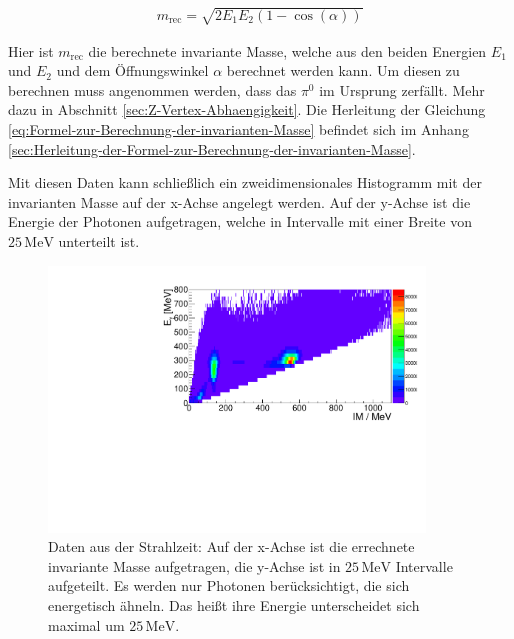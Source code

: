 \documentclass[a4paper,11pt,oneside,final,german,openbib,pdftex]{scrbook}
\begin{document}
{ \begin{equation}
 \begin{split}
 {m_{\text{rec}}=\sqrt{2E_1E_2(1-\cos(\alpha))}}
 \label{eq:Formel-zur-Berechnung-der-invarianten-Masse}
 \end{split}
 \end{equation}

Hier ist $m_{\text{rec}}$ die berechnete invariante Masse, welche aus den beiden Energien $E_1$ und $E_2$ und dem \"Offnungswinkel $\alpha$ berechnet werden kann. Um diesen zu berechnen muss angenommen werden, dass das $\pi^0$ im Ursprung zerf\"allt. Mehr dazu in Abschnitt \ref{sec:Z-Vertex-Abhaengigkeit}.
Die Herleitung der Gleichung \ref{eq:Formel-zur-Berechnung-der-invarianten-Masse} befindet sich im Anhang \ref{sec:Herleitung-der-Formel-zur-Berechnung-der-invarianten-Masse}.

Mit diesen Daten kann schließlich ein zweidimensionales Histogramm mit der invarianten Masse auf der x-Achse angelegt werden. Auf der y-Achse ist die Energie der Photonen aufgetragen, welche in Intervalle mit einer Breite von $25 \,\text{MeV}$ unterteilt ist. 


\begin{figure}[h!]
	\begin{center}
		\includegraphics[width=100mm]{NewCalib/Strahlzeit2014/20171904Uncharged2DHist}
	
		\caption[Strahlzeit: 2D-Histogramm; Keine weiteren Bedingungen]{Daten aus der Strahlzeit: Auf der x-Achse ist die errechnete invariante Masse aufgetragen, die y-Achse ist in $25 \,\text{MeV}$ Intervalle aufgeteilt. Es werden nur Photonen ber\"ucksichtigt, die sich energetisch ähneln. Das hei{\ss}t ihre Energie unterscheidet sich maximal um $25 \,\text{MeV}$.}
			\label{fig:Energy-Interval-Hist-All-Bins}
	\end{center}
\end{figure}

}
\end{document}
